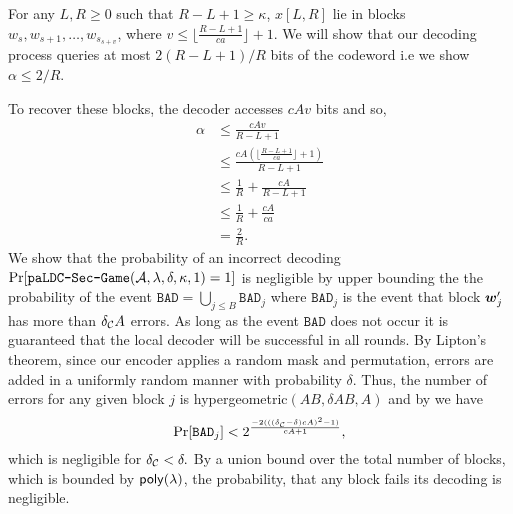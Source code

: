 \begin{IEEEproof}
    For any $L,R \geq 0$ such that $R - L + 1 \geq \kappa$, $x[L,R]$ lie in blocks $w_{s},w_{s+1},\dots,w_{s_{s + v}}$, where $v \leq \lfloor{\frac{R - L + 1}{ca}}\rfloor + 1$.
    We will show that our decoding process queries at most $2(R - L + 1) / R$ bits of the codeword i.e we show $\alpha \leq 2/R$.
    
    To recover these blocks, the decoder accesses $cAv$ bits and so,
    \begin{align*}
        \alpha &\leq \frac{cAv}{R - L + 1} \\
               &\leq \frac{cA\left(\lfloor{\frac{R - L + 1}{ca}}\rfloor + 1\right)}{R - L + 1} \\
               &\leq \frac{1}{R} + \frac{cA}{R - L + 1} \\
               &\leq \frac{1}{R} + \frac{cA}{ca}  \tag{$ca \leq R - L + 1 $}\\
               &= \frac{2}{R}.
    \end{align*}
    We show that the probability of an incorrect decoding $\Pr[\texttt{paLDC-Sec-Game}(\mathcal{A},\lambda,\delta,\kappa,1) = 1]$ is negligible by upper bounding the the probability of the event $\mathtt{BAD} = \bigcup_{j \leq B} \mathtt{BAD}_{j}$ where $\mathtt{BAD}_j$ is the event that block $\boldsymbol{w}'_j$ has more than $\delta_{\mathcal{C}} A$ errors. 
    As long as the event $\mathtt{BAD}$ does not occur it is guaranteed that the local decoder will be successful in all rounds. 
    By Lipton's theorem\cite{STACS:Lipton94}, since our encoder applies a random mask and permutation, errors are added in a uniformly random manner with probability $\delta.$
    Thus, the number of errors for any given block $j$ is hypergeometric$(AB,\delta A B,A)$ and by \cite{goldberg_public_2011,hush_concentration_2005} we have 
    \[\Pr[\mathtt{BAD}_{j}] < 2^{\frac{-2(((\delta_{\mathcal{C}} - \delta)cA)^2 - 1)}{cA + 1}},\]
    which is negligible for $\delta_{\mathcal{C}} < \delta.$
    By a union bound over the total number of blocks, which is bounded by $\mathsf{poly}(\lambda)$, the probability, that any block fails its decoding is negligible. 
\end{IEEEproof}